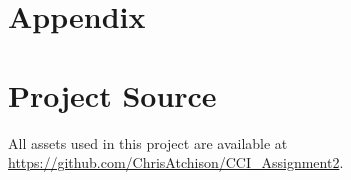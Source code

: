 



















\clearpage

\appendix

\section{Appendix}

\section*{Project Source}

All assets used in this project are available at \url{https://github.com/ChrisAtchison/CCI_Assignment2}.



\printbibliography

